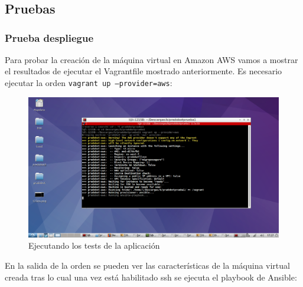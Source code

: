 \chapter{}

\section{Pruebas}

\subsection{Prueba despliegue}

Para probar la creación de la máquina virtual en Amazon AWS vamos a mostrar el resultados de ejecutar el Vagrantfile mostrado anteriormente. Es necesario ejecutar la orden \texttt{vagrant up --provider=aws}:
\begin{figure}[H] %
\centering
\includegraphics[scale=0.3]{imagenes/random/2017-09-05-172749_1366x768_scrot.png}  %

\caption{Ejecutando los tests de la aplicación}\label{figura92}

\end{figure}

En la salida de la orden se pueden ver las características de la máquina virtual creada tras lo cual una vez está habilitado ssh se ejecuta el playbook de Ansible:

